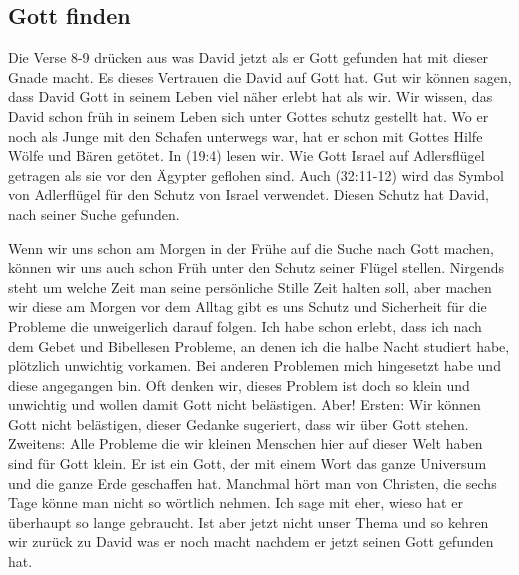 \documentclass[14pt]{../../inc/mybib}
\begin{document}
    \subsection{Gott finden}
    \begin{block}
        Die Verse 8-9 drücken aus was David jetzt als er Gott gefunden hat mit dieser Gnade macht. Es dieses Vertrauen die David auf Gott hat. Gut wir können sagen, dass David Gott in seinem Leben viel näher erlebt hat als wir. Wir wissen, das David schon früh in seinem Leben sich unter Gottes schutz gestellt hat. Wo er noch als Junge mit den Schafen unterwegs war, hat er schon mit Gottes Hilfe Wölfe und Bären getötet. In (19:4) lesen wir. Wie Gott Israel auf Adlersflügel getragen als sie vor den Ägypter geflohen sind. Auch (32:11-12) wird das Symbol von Adlerflügel für den Schutz von Israel verwendet. Diesen Schutz hat David, nach seiner Suche gefunden. 
    \end{block}
    \begin{block}
        Wenn wir uns schon am Morgen in der Frühe auf die Suche nach Gott machen, können wir uns auch schon Früh unter den Schutz seiner Flügel stellen. Nirgends steht um welche Zeit man seine persönliche Stille Zeit halten soll, aber machen wir diese am Morgen vor dem Alltag gibt es uns Schutz und Sicherheit für die Probleme die unweigerlich darauf folgen. Ich habe schon erlebt, dass ich nach dem Gebet und Bibellesen Probleme, an denen ich die halbe Nacht studiert habe, plötzlich unwichtig vorkamen. Bei anderen Problemen mich hingesetzt habe und diese angegangen bin. Oft denken wir, dieses Problem ist doch so klein und unwichtig und wollen damit Gott nicht belästigen. Aber! Ersten: Wir können Gott nicht belästigen, dieser Gedanke sugeriert, dass wir über Gott stehen. Zweitens: Alle Probleme die wir kleinen Menschen hier auf dieser Welt haben sind für Gott klein. Er ist ein Gott, der mit einem Wort das ganze Universum und die ganze Erde geschaffen hat. Manchmal hört man von Christen, die sechs Tage könne man nicht so wörtlich nehmen. Ich sage mit eher, wieso hat er überhaupt so lange gebraucht. Ist aber jetzt nicht unser Thema und so kehren wir zurück zu David was er noch macht nachdem er jetzt seinen Gott gefunden hat.
    \end{block}
\end{document}

